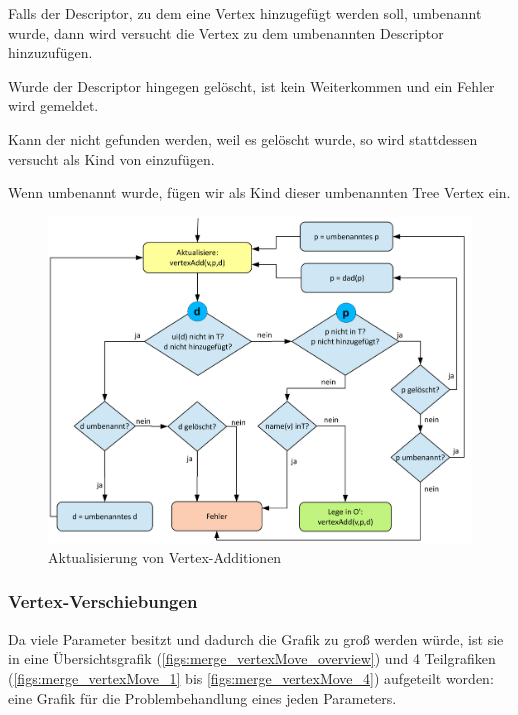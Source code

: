 Falls der Descriptor, zu dem eine Vertex hinzugefügt werden soll, umbenannt wurde, dann wird versucht die Vertex zu dem umbenannten Descriptor hinzuzufügen. \par

Wurde der Descriptor hingegen gelöscht, ist kein Weiterkommen und ein Fehler wird gemeldet. \par

Kann der  nicht gefunden werden, weil es gelöscht wurde, so wird stattdessen versucht  als Kind von  einzufügen. \par
 
Wenn  umbenannt wurde, fügen wir  als Kind dieser umbenannten Tree Vertex ein.

\begin{figure}
\begin{center}
\includegraphics[width=1.1\textwidth]{figs/merge_vertexAdd.pdf}
\end{center}
\caption{Aktualisierung von Vertex-Additionen}
\label{figs:merge_vertexAdd}
\end{figure}

\subsubsection{Vertex-Verschiebungen}
Da  viele Parameter besitzt und dadurch die Grafik zu groß werden würde, ist sie in eine Übersichtsgrafik (\autoref{figs:merge_vertexMove_overview}) und 4 Teilgrafiken (\autoref{figs:merge_vertexMove_1} bis \autoref{figs:merge_vertexMove_4}) aufgeteilt worden: eine Grafik für die Problembehandlung eines jeden Parameters. \par

